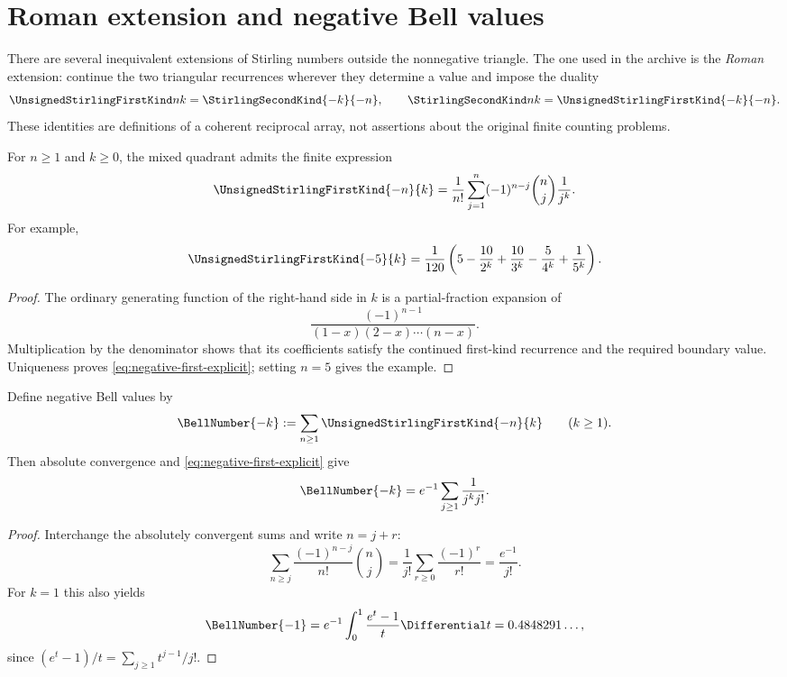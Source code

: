 \documentclass[11pt,a4paper,oneside,openany]{book}
\theoremstyle{definition}
\theoremstyle{remark}
\begin{document}
\section{Roman extension and negative Bell values}
There are several inequivalent extensions of Stirling numbers outside the
nonnegative triangle.  The one used in the archive is the \emph{Roman} extension:
continue the two triangular recurrences wherever they determine a value and impose
the duality
\begin{equation}\label{eq:roman-duality}
 \UnsignedStirlingFirstKind nk=\StirlingSecondKind{-k}{-n},\qquad
 \StirlingSecondKind nk=\UnsignedStirlingFirstKind{-k}{-n}.
\end{equation}
These identities are definitions of a coherent reciprocal array, not assertions
about the original finite counting problems.

For $n\ge1$ and $k\ge0$, the mixed quadrant admits the finite expression
\begin{equation}\label{eq:negative-first-explicit}
 \UnsignedStirlingFirstKind{-n}{k}=\frac1{n!}\sum_{j=1}^n(-1)^{n-j}\binom nj\frac1{j^k}.
\end{equation}
For example,
\begin{equation}\label{eq:negative-first-five}
 \UnsignedStirlingFirstKind{-5}{k}=\frac1{120}
 \left(5-\frac{10}{2^k}+\frac{10}{3^k}-\frac5{4^k}+\frac1{5^k}\right).
\end{equation}
\begin{proof}
The ordinary generating function of the right-hand side in $k$ is a partial-fraction
expansion of
\[
 \frac{(-1)^{n-1}}{(1-x)(2-x)\cdots(n-x)}.
\]
Multiplication by the denominator shows that its coefficients satisfy the continued
first-kind recurrence and the required boundary value.  Uniqueness proves
\cref{eq:negative-first-explicit}; setting $n=5$ gives the example.
\end{proof}

Define negative Bell values by
\begin{equation}\label{eq:negative-bell-def}
 \BellNumber{-k}:=\sum_{n\ge1}\UnsignedStirlingFirstKind{-n}{k}\qquad(k\ge1).
\end{equation}
Then absolute convergence and \cref{eq:negative-first-explicit} give
\begin{equation}\label{eq:negative-dobinski}
 \BellNumber{-k}=e^{-1}\sum_{j\ge1}\frac1{j^k j!}.
\end{equation}
\begin{proof}
Interchange the absolutely convergent sums and write $n=j+r$:
\[
 \sum_{n\ge j}\frac{(-1)^{n-j}}{n!}\binom nj
 =\frac1{j!}\sum_{r\ge0}\frac{(-1)^r}{r!}=\frac{e^{-1}}{j!}.
\]
For $k=1$ this also yields
\[
 \BellNumber{-1}=e^{-1}\int_0^1\frac{e^t-1}{t}\Differential t
 =0.4848291\ldots,
\]
since $(e^t-1)/t=\sum_{j\ge1}t^{j-1}/j!$.
\end{proof}
\end{document}
